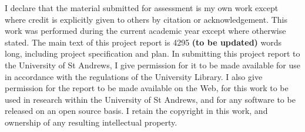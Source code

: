I declare that the material submitted for assessment is my own work except where credit is explicitly given to others by citation or acknowledgement. This work was performed during the current academic year except where otherwise stated. The main text of this project report is 4295 \textbf{(to be updated)} words long, including project specification and plan. In submitting this project report to the University of St Andrews, I give permission for it to be made available for use in accordance with the regulations of the University Library. I also give permission for the report to be made available on the Web, for this work to be used in research within the University of St Andrews, and for any software to be released on an open source basis. I retain the copyright in this work, and ownership of any resulting intellectual property.
